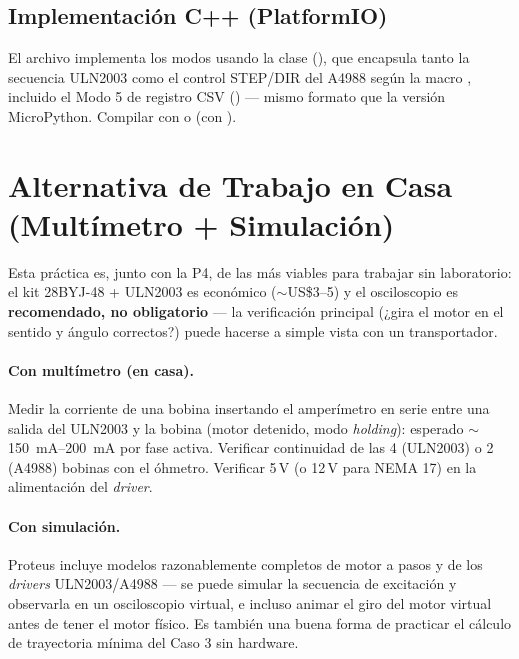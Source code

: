 \documentclass[11pt]{article}
\begin{document}
\subsection{Implementación C++ (PlatformIO)}
El archivo  implementa los modos usando la clase 
(), que encapsula tanto la secuencia ULN2003 como el control
STEP/DIR del A4988 según la macro , incluido el Modo 5 de
registro CSV () — mismo formato  que la
versión MicroPython. Compilar con  o  (con ).

\section{Alternativa de Trabajo en Casa (Multímetro + Simulación)}
\label{sec:casa}

Esta práctica es, junto con la P4, de las más viables para trabajar sin laboratorio: el
kit 28BYJ-48 + ULN2003 es económico ($\sim$US\$3--5) y el osciloscopio es
\textbf{recomendado, no obligatorio} — la verificación principal (¿gira el motor en el
sentido y ángulo correctos?) puede hacerse a simple vista con un transportador.

\paragraph{Con multímetro (en casa).} Medir la corriente de una bobina insertando el
amperímetro en serie entre una salida del ULN2003 y la bobina (motor detenido, modo
\emph{holding}): esperado $\sim$\SIrange{150}{200}{\milli\ampere} por fase activa.
Verificar continuidad de las 4 (ULN2003) o 2 (A4988) bobinas con el óhmetro. Verificar
5\,V (o 12\,V para NEMA 17) en la alimentación del \emph{driver}.

\paragraph{Con simulación.} Proteus incluye modelos razonablemente completos de motor a
pasos y de los \emph{drivers} ULN2003/A4988 — se puede simular la secuencia de excitación
y observarla en un osciloscopio virtual, e incluso animar el giro del motor virtual antes
de tener el motor físico. Es también una buena forma de practicar el cálculo de
trayectoria mínima del Caso 3 sin hardware.
\end{document}
